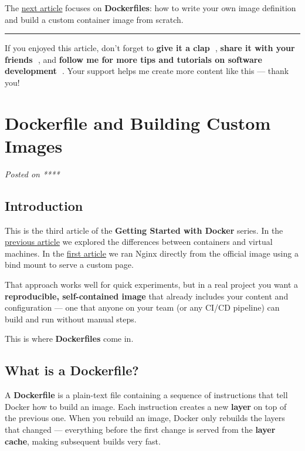 \documentclass[11pt,american,a4paper,openany]{book}
\begin{document}
The
\href{/Users/sasadangelo/github.com/sasadangelo/code4projects/dockerfile-and-building-custom-images/}{next
article} focuses on \textbf{Dockerfiles}: how to write your own image
definition and build a custom container image from scratch.

\begin{center}\rule{0.5\linewidth}{0.5pt}\end{center}

If you enjoyed this article, don't forget to \textbf{give it a clap 👏},
\textbf{share it with your friends 🔗}, and \textbf{follow me for more
tips and tutorials on software development 📘}. Your support helps me
create more content like this --- thank you! 🙌

\section{Dockerfile and Building Custom
Images}\label{dockerfile-and-building-custom-images}

\emph{Posted on ****}

\subsection{Introduction}\label{introduction-2}

This is the third article of the \textbf{Getting Started with Docker}
series. In the
\href{/Users/sasadangelo/github.com/sasadangelo/code4projects/containers-vs-virtual-machines-2025/}{previous
article} we explored the differences between containers and virtual
machines. In the
\href{/Users/sasadangelo/github.com/sasadangelo/code4projects/getting-started-with-docker-2025/}{first
article} we ran Nginx directly from the official image using a bind
mount to serve a custom page.

That approach works well for quick experiments, but in a real project
you want a \textbf{reproducible, self-contained image} that already
includes your content and configuration --- one that anyone on your team
(or any CI/CD pipeline) can build and run without manual steps.

This is where \textbf{Dockerfiles} come in.

\subsection{What is a Dockerfile?}\label{what-is-a-dockerfile}

A \textbf{Dockerfile} is a plain-text file containing a sequence of
instructions that tell Docker how to build an image. Each instruction
creates a new \textbf{layer} on top of the previous one. When you
rebuild an image, Docker only rebuilds the layers that changed ---
everything before the first change is served from the \textbf{layer
cache}, making subsequent builds very fast.
\end{document}
